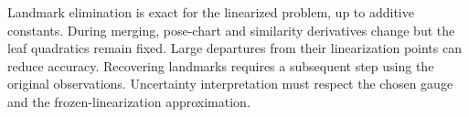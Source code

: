 \documentclass[11pt,letterpaper]{article}
\begin{document}
Landmark elimination is exact for the linearized problem, up to additive constants.
During merging, pose-chart and similarity derivatives change but the leaf
quadratics remain fixed. Large departures from their linearization points can
reduce accuracy. Recovering landmarks requires a subsequent step using the
original observations. Uncertainty interpretation must respect the chosen gauge
and the frozen-linearization approximation.
\end{document}
